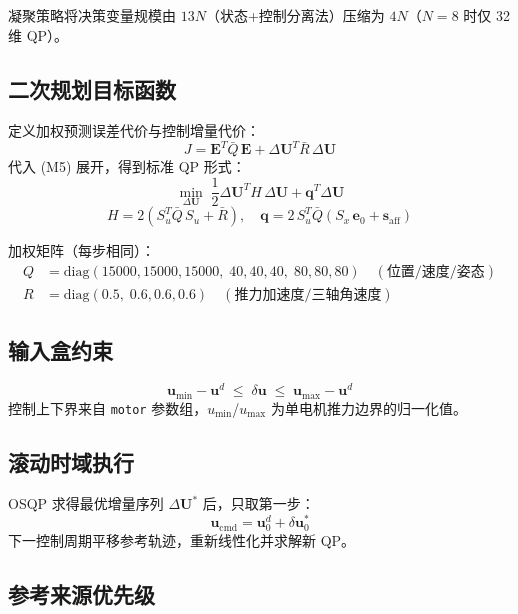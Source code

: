 \documentclass[UTF8, a4paper, 11pt]{ctexart}
\newcommand{\bu}{\mathbf{u}}
\newcommand{\diag}{\mathrm{diag}}
\begin{document}
凝聚策略将决策变量规模由 $13N$（状态+控制分离法）压缩为 $4N$（$N=8$ 时仅 32 维 QP）。

\subsection{二次规划目标函数}

定义加权预测误差代价与控制增量代价：
\begin{equation}
  J = \mathbf{E}^T\bar{Q}\,\mathbf{E} + \Delta\mathbf{U}^T\bar{R}\,\Delta\mathbf{U}
  \tag{M6}
\end{equation}
代入 (M5) 展开，得到标准 QP 形式：
\begin{equation}
  \min_{\Delta\mathbf{U}}\;\frac{1}{2}\Delta\mathbf{U}^T H\,\Delta\mathbf{U} + \mathbf{q}^T\Delta\mathbf{U}
  \tag{M8}
\end{equation}
\[
  H = 2\!\left(S_u^T\bar{Q}\,S_u + \bar{R}\right), \quad \mathbf{q} = 2\,S_u^T\bar{Q}\!\left(S_x\,\mathbf{e}_0 + \mathbf{s}_{\text{aff}}\right)
\]

加权矩阵（每步相同）：
\begin{align*}
  Q &= \diag(15000,15000,15000,\;40,40,40,\;80,80,80) \quad (\text{位置/速度/姿态})\\
  R &= \diag(0.5,\;0.6,0.6,0.6) \quad (\text{推力加速度/三轴角速度})
\end{align*}

\subsection{输入盒约束}

\begin{equation}
  \bu_{\min} - \bu^d \;\leq\; \delta\bu \;\leq\; \bu_{\max} - \bu^d
  \tag{M7}
\end{equation}
控制上下界来自 \texttt{motor} 参数组，$u_{\min}$/$u_{\max}$ 为单电机推力边界的归一化值。

\subsection{滚动时域执行}

OSQP 求得最优增量序列 $\Delta\mathbf{U}^*$ 后，只取第一步：
\begin{equation}
  \bu_{\text{cmd}} = \bu^d_0 + \delta\bu^*_0
  \tag{M9}
\end{equation}
下一控制周期平移参考轨迹，重新线性化并求解新 QP。

\subsection{参考来源优先级}
\end{document}
